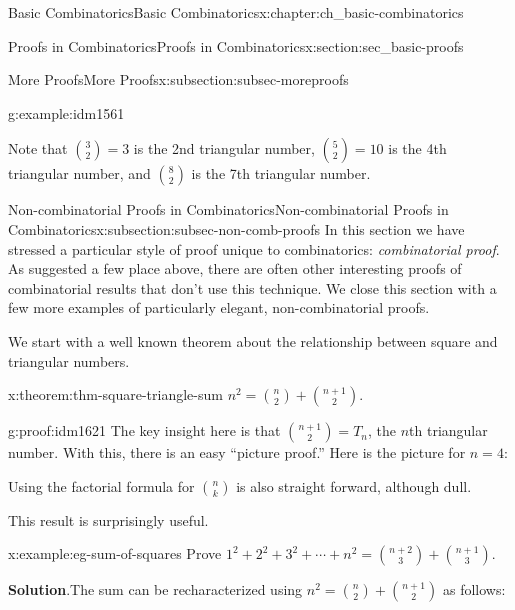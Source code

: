 \documentclass[oneside,10pt,]{book}
\numberwithin{equation}{chapter}
\begin{document}
\begin{chapterptx}{Basic Combinatorics}{}{Basic Combinatorics}{}{}{x:chapter:ch_basic-combinatorics}
\begin{sectionptx}{Proofs in Combinatorics}{}{Proofs in Combinatorics}{}{}{x:section:sec_basic-proofs}
\begin{subsectionptx}{More Proofs}{}{More Proofs}{}{}{x:subsection:subsec-moreproofs}
\begin{example}{}{g:example:idm1561}
\begin{enumerate}
\begin{image}{0.35}{0.3}{0.35}
{}%
\end{image}%
Note that \(\binom{3}{2} = 3\) is the 2nd triangular number, \(\binom{5}{2} = 10\) is the 4th triangular number, and \(\binom{8}{2}\) is the 7th triangular number.%
\end{enumerate}
%
\end{example}
\end{subsectionptx}
%
%
\typeout{************************************************}
\typeout{************************************************}
%
\begin{subsectionptx}{Non-combinatorial Proofs in Combinatorics}{}{Non-combinatorial Proofs in Combinatorics}{}{}{x:subsection:subsec-non-comb-proofs}
In this section we have stressed a particular style of proof unique to combinatorics: \emph{combinatorial proof}.  As suggested a few place above, there are often other interesting proofs of combinatorial results that don't use this technique.  We close this section with a few more examples of particularly elegant, non-combinatorial proofs.%
\par
We start with a well known theorem about the relationship between square and triangular numbers.%
\begin{theorem}{}{}{x:theorem:thm-square-triangle-sum}%
\(n^2 = \binom{n}{2} + \binom{n+1}{2}\).%
\end{theorem}
\begin{proofptx}{}{g:proof:idm1621}
The key insight here is that \(\binom{n+1}{2} = T_{n}\), the \(n\)th triangular number.  With this, there is an easy ``picture proof.''  Here is the picture for \(n = 4\):%
\begin{image}{0.35}{0.3}{0.35}%
%
\end{image}%
Using the factorial formula for \(\binom{n}{k}\) is also straight forward, although dull.%
\end{proofptx}
This result is surprisingly useful.%
\begin{example}{}{x:example:eg-sum-of-squares}%
Prove \(1^2 + 2^2 + 3^2 + \cdots + n^2 = \binom{n+2}{3} + \binom{n+1}{3}\).%
\par\smallskip%
\noindent\textbf{Solution}.\hypertarget{g:solution:idm1636}{}\quad{}The sum can be recharacterized using \(n^2 = \binom{n}{2}+\binom{n+1}{2}\) as follows:%

\end{example}
\end{subsectionptx}
\end{sectionptx}
\end{chapterptx}
\end{document}
